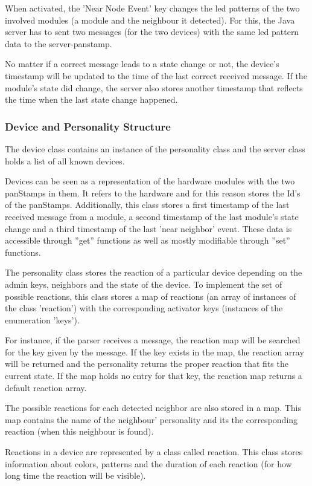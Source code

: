 When activated, the 'Near Node Event' key changes the led patterns of the two involved modules (a module and the neighbour it detected). For this, the Java server has to sent two messages (for the two devices) with the same led pattern data to the server-panstamp.  

No matter if a correct message leads to a state change or not, the device's timestamp will be updated to the time of the last correct received message. If the module's state did change, the server also stores another timestamp that reflects the time when the last state change happened.

\subsubsection{Device and Personality Structure}
The device class contains an instance of the personality class and the server class holds a list of all known devices.

Devices can be seen as a representation of the hardware modules with the two panStamps in them. It refers to the hardware and for this reason stores the Id's of the panStamps. Additionally, this class stores a first timestamp of the last received message from a module, a second timestamp of the last module's state change and a third timestamp of the last 'near neighbor' event. These data is accessible through ''get'' functions as well as mostly modifiable through ''set'' functions.

The personality class stores the reaction of a particular device depending on the admin keys, neighbors and the state of the device. To implement the set of possible reactions, this class stores a map of reactions (an array of instances of the class 'reaction') with the corresponding activator keys (instances of the enumeration 'keys').

For instance, if the parser receives a message, the reaction map will be searched for the key given by the message. If the key exists in the map, the reaction array will be returned and the personality returns the proper reaction that fits the current state. If the map holds no entry for that key, the reaction map returns a default reaction array.

The possible reactions for each detected neighbor are also stored in a map. This
map contains the name of the neighbour' personality and its the corresponding reaction (when this neighbour is found). 

Reactions in a device are represented by a class called reaction. This class stores information
about colors, patterns and the duration of each reaction (for how long time the reaction will be visible).

